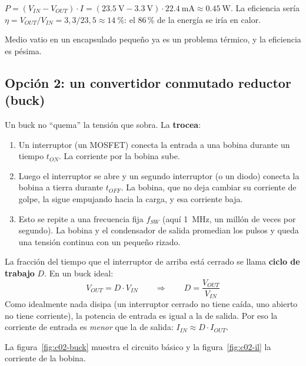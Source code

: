 \begin{calculo}
$P = (V_{IN}-V_{OUT})\cdot I = (\SI{23.5}{\volt}-\SI{3.3}{\volt})\cdot\SI{22.4}{\milli\ampere} \approx \SI{0.45}{\watt}$.
La eficiencia sería $\eta = V_{OUT}/V_{IN} = 3{,}3/23{,}5 \approx \SI{14}{\percent}$: el 86\,\% de la energía se iría en calor.
\end{calculo}

Medio vatio en un encapsulado pequeño ya es un problema térmico, y la eficiencia es pésima.

\subsection{Opción 2: un convertidor conmutado reductor (buck)}

\begin{idea}
Un buck no ``quema'' la tensión que sobra. La \textbf{trocea}:
\begin{enumerate}
  \item Un interruptor (un MOSFET) conecta la entrada a una bobina durante un tiempo $t_{ON}$. La corriente por la bobina sube.
  \item Luego el interruptor se abre y un segundo interruptor (o un diodo) conecta la bobina a tierra durante $t_{OFF}$. La bobina, que no deja cambiar su corriente de golpe, la sigue empujando hacia la carga, y esa corriente baja.
  \item Esto se repite a una frecuencia fija $f_{SW}$ (aquí \SI{1}{\mega\hertz}, un millón de veces por segundo). La bobina y el condensador de salida promedian los pulsos y queda una tensión continua con un pequeño rizado.
\end{enumerate}
La fracción del tiempo que el interruptor de arriba está cerrado se llama \textbf{ciclo de trabajo} $D$. En un buck ideal:
\begin{equation}
V_{OUT} = D\cdot V_{IN} \qquad\Rightarrow\qquad D = \frac{V_{OUT}}{V_{IN}}
\label{eq:c02-duty}
\end{equation}
Como idealmente nada disipa (un interruptor cerrado no tiene caída, uno abierto no tiene corriente), la potencia de entrada es igual a la de salida. Por eso la corriente de entrada es \emph{menor} que la de salida: $I_{IN}\approx D\cdot I_{OUT}$.
\end{idea}

La figura~\ref{fig:c02-buck} muestra el circuito básico y la figura~\ref{fig:c02-il} la corriente de la bobina.

